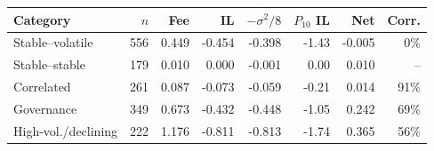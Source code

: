 \begin{tabular}{@{}lrrrrrrr@{}}
\toprule
Category & $n$ & Fee & IL & $-\sigma^2/8$ & $P_{10}$ IL & Net & Corr. \\
\midrule
Stable--volatile & 556 & 0.449 & -0.454 & -0.398 & -1.43 & -0.005 & 0\% \\
Stable--stable & 179 & 0.010 & 0.000 & -0.001 & 0.00 & 0.010 & -- \\
Correlated & 261 & 0.087 & -0.073 & -0.059 & -0.21 & 0.014 & 91\% \\
Governance & 349 & 0.673 & -0.432 & -0.448 & -1.05 & 0.242 & 69\% \\
High-vol./declining & 222 & 1.176 & -0.811 & -0.813 & -1.74 & 0.365 & 56\% \\
\bottomrule
\end{tabular}
